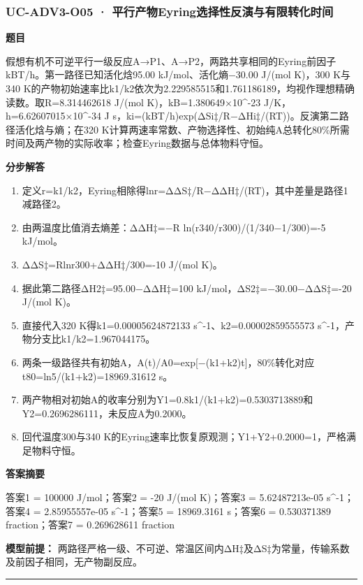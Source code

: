 \documentclass[UTF8,11pt,a4paper]{ctexart}
\begin{document}
\subsubsection*{UC-ADV3-O05 · 平行产物Eyring选择性反演与有限转化时间}
\noindent\textbf{题目}\par
假想有机不可逆平行一级反应A→P1、A→P2，两路共享相同的Eyring前因子kBT/h。第一路径已知活化焓95.00 kJ/mol、活化熵−30.00 J/(mol K)，300 K与340 K的产物初始速率比k1/k2依次为2.229585515和1.761186189，均视作理想精确读数。取R=8.314462618 J/(mol K)，kB=1.380649×10\textasciicircum{}-23 J/K，h=6.62607015×10\textasciicircum{}-34 J s，ki=(kBT/h)exp(ΔSi‡/R−ΔHi‡/(RT))。反演第二路径活化焓与熵；在320 K计算两速率常数、产物选择性、初始纯A总转化80\%所需时间及两产物的实际收率；检查Eyring数据与总体物料守恒。\par
\medskip\noindent\textbf{分步解答}
\begin{enumerate}
\item 定义r=k1/k2，Eyring相除得lnr=ΔΔS‡/R−ΔΔH‡/(RT)，其中差量是路径1减路径2。
\item 由两温度比值消去熵差：ΔΔH‡=−R ln(r340/r300)/(1/340−1/300)=-5 kJ/mol。
\item ΔΔS‡=Rlnr300+ΔΔH‡/300=-10 J/(mol K)。
\item 据此第二路径ΔH2‡=95.00−ΔΔH‡=100 kJ/mol，ΔS2‡=−30.00−ΔΔS‡=-20 J/(mol K)。
\item 直接代入320 K得k1=0.00005624872133 s\textasciicircum{}-1、k2=0.00002859555573 s\textasciicircum{}-1，产物分支比k1/k2=1.967044175。
\item 两条一级路径共有初始A，A(t)/A0=exp[−(k1+k2)t]，80\%转化对应t80=ln5/(k1+k2)=18969.31612 s。
\item 两产物相对初始A的收率分别为Y1=0.8k1/(k1+k2)=0.5303713889和Y2=0.2696286111，未反应A为0.2000。
\item 回代温度300与340 K的Eyring速率比恢复原观测；Y1+Y2+0.2000=1，严格满足物料守恒。
\end{enumerate}
\noindent\textbf{答案摘要}\par
答案1 = 100000 J/mol；答案2 = -20 J/(mol K)；答案3 = 5.62487213e-05 s\textasciicircum{}-1；答案4 = 2.85955557e-05 s\textasciicircum{}-1；答案5 = 18969.3161 s；答案6 = 0.530371389 fraction；答案7 = 0.269628611 fraction\par
\noindent\textbf{模型前提：}
两路径严格一级、不可逆、常温区间内ΔH‡及ΔS‡为常量，传输系数及前因子相同，无产物副反应。\par
\medskip\hrule\medskip
{}
\end{document}
